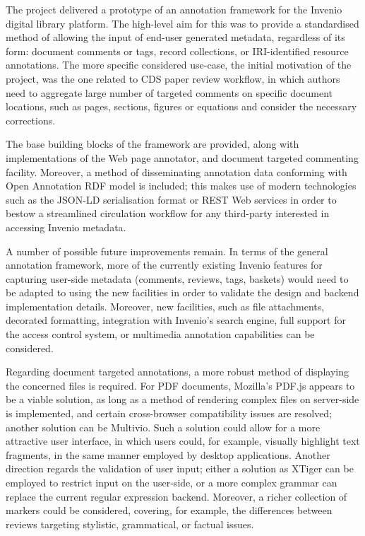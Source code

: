 
The project delivered a prototype of an annotation framework for the Invenio
digital library platform. The high-level aim for this was to provide a
standardised method of allowing the input of end-user generated metadata,
regardless of its form: document comments or tags, record collections, or
IRI-identified resource annotations. The more specific considered use-case, the
initial motivation of the project, was the one related to CDS paper review
workflow, in which authors need to aggregate large number of targeted comments
on specific document locations, such as pages, sections, figures or equations and
consider the necessary corrections.

The base building blocks of the framework are provided, along with
implementations of the Web page annotator, and document targeted commenting
facility. Moreover, a method of disseminating annotation data conforming with
Open Annotation RDF model is included; this makes use of modern
technologies such as the JSON-LD serialisation format or REST Web services in
order to bestow a streamlined circulation workflow for any third-party
interested in accessing Invenio metadata.

A number of possible future improvements remain. In terms of the general
annotation framework, more of the currently existing Invenio features for
capturing user-side metadata (comments, reviews, tags, baskets) would need to
be adapted to using the new facilities in order to validate the design and
backend implementation details. Moreover, new facilities, such as file
attachments, decorated formatting, integration with Invenio's search engine,
full support for the access control system, or multimedia annotation
capabilities can be considered.

Regarding document targeted annotations, a more robust method of displaying the
concerned files is required. For PDF documents, Mozilla's PDF.js
appears to be a viable solution, as long as a method of rendering complex files
on server-side is implemented, and certain cross-browser compatibility issues
are resolved; another solution can be Multivio. Such a solution could allow for
a more attractive user interface, in which users could, for example, visually
highlight text fragments, in the same manner employed by desktop applications.
Another direction regards the validation of user input; either a solution as
XTiger can be employed to restrict input on the user-side, or a more complex
grammar can replace the current regular expression backend. Moreover, a
richer collection of markers could be considered, covering, for example, the
differences between reviews targeting stylistic, grammatical, or factual issues.

